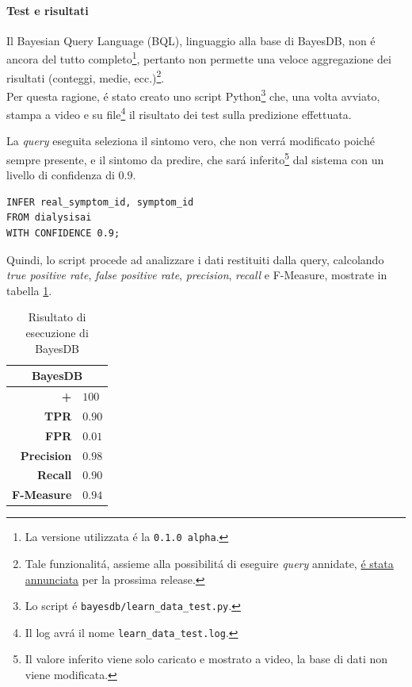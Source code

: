 \documentclass[preprint]{acm_proc_article-sp}
\begin{document}
\paragraph{Test e risultati}
Il Bayesian Query Language (BQL), linguaggio alla base di BayesDB, non \'e ancora del tutto completo\footnote{La versione utilizzata \'e la \verb|0.1.0 alpha|.}, pertanto non permette una veloce aggregazione dei risultati (conteggi, medie, ecc.)\footnote{Tale funzionalit\'a, assieme alla possibilit\'a di eseguire \textit{query} annidate, \href{https://github.com/mit-probabilistic-computing-project/BayesDB/issues/20}{\'e stata annunciata} per la prossima release.}.\\
Per questa ragione, \'e stato creato uno script Python\footnote{Lo script \'e \verb|bayesdb/learn_data_test.py|.} che, una volta avviato, stampa a video e su file\footnote{Il log avr\'a il nome \verb|learn_data_test.log|.} il risultato dei test sulla predizione effettuata.

La \textit{query} eseguita seleziona il sintomo vero, che non verr\'a modificato poich\'e sempre presente, e il sintomo da predire, che sar\'a inferito\footnote{Il valore inferito viene solo caricato e mostrato a video, la base di dati non viene modificata.} dal sistema con un livello di confidenza di $0.9$.
\begin{verbatim}
INFER real_symptom_id, symptom_id 
FROM dialysisai
WITH CONFIDENCE 0.9;
\end{verbatim}

Quindi, lo script procede ad analizzare i dati restituiti dalla query, calcolando \textit{true positive rate}, \textit{false positive rate}, \textit{precision}, \textit{recall} e F-Measure, mostrate in tabella \ref{table:risultati-bayesdb}.

\begin{table}[h]
\centering
\begin{tabular}{|r|l|} \hline
\multicolumn{2}{|c|}{\textbf{BayesDB}} \\ \hline \hline 
\textbf{+} & $100$ \\ \hline
\textbf{TPR} & $0.90$ \\ \hline
\textbf{FPR} & $0.01$ \\ \hline
\textbf{Precision} & $0.98$ \\ \hline
\textbf{Recall} & $0.90$ \\  \hline
\textbf{F-Measure} & $0.94$ \\
\hline\end{tabular}
\caption{Risultato di esecuzione di BayesDB}
\label{table:risultati-bayesdb}
\end{table}
\end{document}
